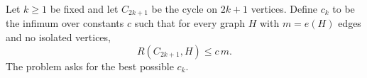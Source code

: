 Let $k\ge 1$ be fixed and let $C_{2k+1}$ be the cycle on $2k+1$ vertices. Define $c_k$ to be the infimum over constants $c$ such that for every graph $H$ with $m=e(H)$ edges and no isolated vertices,
\[
R(C_{2k+1},H) \le c\,m.
\]
The problem asks for the best possible $c_k$.
